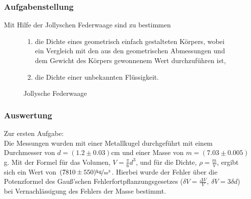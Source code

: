 \documentclass[11pt,a4paper]{article}
\begin{document}
\subsubsection{Aufgabenstellung}
Mit Hilfe der Jollyschen Federwaage sind zu bestimmen
\begin{figure}[h]
\begin{minipage}{.5\textwidth}
\begin{enumerate}
\item{die Dichte eines geometrisch einfach gestalteten K\"orpers, wobei ein Vergleich mit den aus den
geometrischen Abmessungen und dem Gewicht des K\"orpers gewonnenem Wert durchzuf\"uhren
ist,}
\item{die Dichte einer unbekannten Fl\"ussigkeit.}
\end{enumerate}
\end{minipage}%
\begin{minipage}{.5\textwidth}
\centering
{}
   \renewcommand\thefigure{B1}
\caption{Jollysche Federwaage}
\label{JS1}

\end{minipage}
\end{figure}

\subsubsection{Auswertung}

Zur ersten Aufgabe:\\
Die Messungen wurden mit einer Metallkugel durchgef\"uhrt mit einem Durch\-messer von $d=(1.2\pm0.03)$cm und einer Masse von $m=(7.03\pm0.005)$g. Mit der Formel f\"ur das Volumen, $V=\frac{\pi}{6}d^3$, und f\"ur die Dichte, $\rho=\frac{m}{V}$, ergibt sich ein Wert von $(7810\pm550)\mathrm{\nicefrac{\textrm{kg}}{m^3}}$. Hierbei wurde der Fehler \"uber die Potenz\-formel des Gau\ss 'schen Fehlerfortpflanzungsgesetzes ($\delta V=\frac{\Delta V}{V},\ \delta V=3\delta d$) bei Vernachl\"assigung des Fehlers der Masse bestimmt.\\
\end{document}
